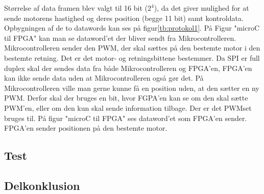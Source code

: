 Størrelse af data framen blev valgt til 16 bit ($2^4$), da det giver mulighed for at sende motorens hastighed og deres position (begge 11 bit) samt kontroldata. Opbygningen af de to datawords kan ses på figur\ref{tb:protokol1}.
På Figur "microC til FPGA" kan man se dataword'et der bliver sendt fra Mikrocontrolleren. Mikrocontrolleren sender den  PWM, der skal sættes på den bestemte motor i den bestemte retning. Det er det motor- og retningsbittene bestemmer.
Da SPI er full duplex skal der sendes data fra både Mikrocontrolleren og FPGA’en, FPGA’en kan ikke sende data uden at Mikrocontrolleren også gør det. På Mikrocontrolleren ville man gerne kunne få en position uden, at den sætter en ny PWM. Derfor skal der bruges en bit, hvor FGPA’en kan se om den skal sætte PWM’en, eller om den kun skal sende information tilbage. Der er det PWMset bruges til.
På figur "microC til FPGA" ses dataword'et som FPGA'en sender. FPGA'en sender positionen på den bestemte motor.


\subsection{Test} 
% 





\subsection{Delkonklusion}
